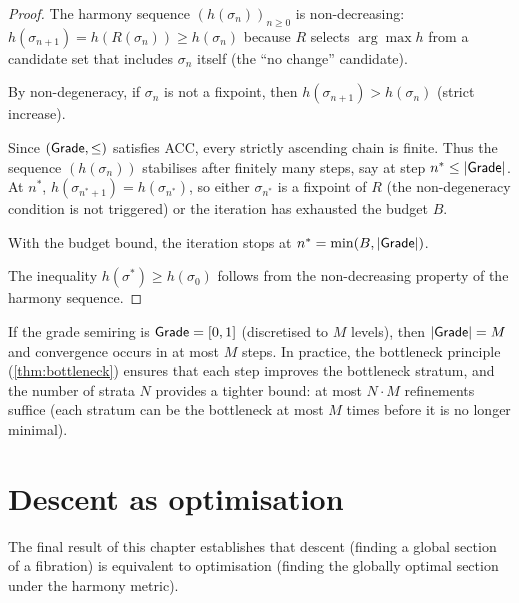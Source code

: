 \begin{proof}
The harmony sequence $(h(\sigma_n))_{n \geq 0}$ is non-decreasing:
$h(\sigma_{n+1}) = h(R(\sigma_n)) \geq h(\sigma_n)$ because $R$
selects $\arg\max h$ from a candidate set that includes $\sigma_n$
itself (the ``no change'' candidate).

By non-degeneracy, if $\sigma_n$ is not a fixpoint, then
$h(\sigma_{n+1}) > h(\sigma_n)$ (strict increase).

Since $(\mathsf{Grade}, \leq)$ satisfies ACC, every strictly ascending chain
is finite.  Thus the sequence $(h(\sigma_n))$ stabilises after
finitely many steps, say at step $n^* \leq |\mathsf{Grade}|$.  At $n^*$,
$h(\sigma_{n^*+1}) = h(\sigma_{n^*})$, so either $\sigma_{n^*}$ is
a fixpoint of $R$ (the non-degeneracy condition is not triggered)
or the iteration has exhausted the budget $B$.

With the budget bound, the iteration stops at
$n^* = \min(B, |\mathsf{Grade}|)$.

The inequality $h(\sigma^*) \geq h(\sigma_0)$ follows from the
non-decreasing property of the harmony sequence.
\end{proof}

\begin{remark}
\label{rem:convergence-rate}
If the grade semiring is $\mathsf{Grade} = [0,1]$ (discretised to $M$
levels), then $|\mathsf{Grade}| = M$ and convergence occurs in at most $M$
steps.  In practice, the bottleneck principle
(\cref{thm:bottleneck}) ensures that each step improves the
bottleneck stratum, and the number of strata $N$ provides a tighter
bound: at most $N \cdot M$ refinements suffice (each stratum can be
the bottleneck at most $M$ times before it is no longer minimal).
\end{remark}

\section{Descent as optimisation}
\label{sec:descent-opt}

The final result of this chapter establishes that descent (finding a
global section of a fibration) is equivalent to optimisation (finding
the globally optimal section under the harmony metric).

